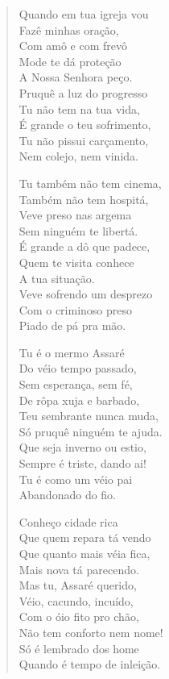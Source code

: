 \begin{verse}
Quando em tua igreja vou\\
Fazê minhas oração,\\
Com amô e com frevô\\
Mode te dá proteção\\
A Nossa Senhora peço.\\
Pruquê a luz do progresso\\
Tu não tem na tua vida,\\
É grande o teu sofrimento,\\
Tu não pissui carçamento,\\
Nem colejo, nem vinida.

Tu também não tem cinema,\\
Também não tem hospitá,\\
Veve preso nas argema\\
Sem ninguém te libertá.\\
É grande a dô que padece,\\
Quem te visita conhece\\
A tua situação.\\
Veve sofrendo um desprezo\\
Com o criminoso preso\\
Piado de pá pra mão.

Tu é o mermo Assaré\\
Do véio tempo passado,\\
Sem esperança, sem fé,\\
De rôpa xuja e barbado,\\
Teu sembrante nunca muda,\\
Só pruquê ninguém te ajuda.\\
Que seja inverno ou estio,\\
Sempre é triste, dando ai!\\
Tu é como um véio pai\\
Abandonado do fio.

Conheço cidade rica\\
Que quem repara tá vendo\\
Que quanto mais véia fica,\\
Mais nova tá parecendo.\\
Mas tu, Assaré querido,\\
Véio, cacundo, incuído,\\
Com o óio fito pro chão,\\
Não tem conforto nem nome!\\
Só é lembrado dos home\\
Quando é tempo de inleição.


\end{verse}
